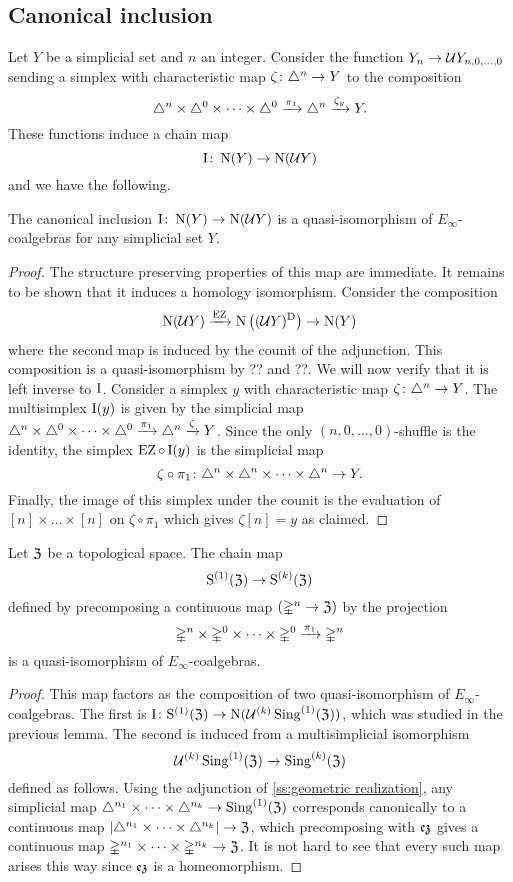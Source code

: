\subsection{Canonical inclusion}

Let $Y$ be a simplicial set and $n$ an integer.
Consider the function $Y_n \to \mathcal{U} Y_{n,0,\dots,0}$ sending a simplex with characteristic map $\zeta \colon \triangle^n \to Y$ to the composition
\[
\triangle^n \times \triangle^{0}\times\dots\times\triangle^{0} \xrightarrow{\pi_1} \triangle^n \xrightarrow{\zeta_y} Y.
\]
These functions induce a chain map
\[
\operatorname{I} \colon \operatorname{N}(Y) \to \operatorname{N}(\mathcal{U} Y)
\]
and we have the following.

\begin{lemma*}
	The canonical inclusion $\operatorname{I} \colon \operatorname{N}(Y) \to \operatorname{N}(\mathcal{U} Y)$ is a quasi-isomorphism of $E_\infty$-coalgebras for any simplicial set $Y$.
\end{lemma*}

\begin{proof}
	The structure preserving properties of this map are immediate.
	It remains to be shown that it induces a homology isomorphism.
	Consider the composition
	\[
	\operatorname{N}(\mathcal{U} Y) \xrightarrow{\operatorname{EZ}}
	\operatorname{N}\big((\mathcal{U} Y)^{\mathrm{D}}\big) \to
	\operatorname{N}(Y)
	\]
	where the second map is induced by the counit of the adjunction.
	This composition is a quasi-isomorphism by ?? and ??.
	We will now verify that it is left inverse to $\operatorname{I}$.
	Consider a simplex $y$ with characteristic map $\zeta \colon \triangle^n \to Y$.
	The multisimplex $\operatorname{I}(y)$ is given by the simplicial map $\triangle^n \times \triangle^{0}\times\dots\times\triangle^{0} \xrightarrow{\pi_1} \triangle^n \xrightarrow{\zeta} Y$.
	Since the only $(n,0,\dots,0)$-shuffle is the identity, the simplex $\operatorname{EZ} \circ \operatorname{I} (y)$ is the simplicial map
	\[
	\zeta \circ \pi_1 \colon \triangle^n \times \triangle^{n}\times\dots\times\triangle^{n} \to Y.
	\]
	Finally, the image of this simplex under the counit is the evaluation of $[n] \times\dots\times [n]$ on $\zeta \circ \pi_1$ which gives $\zeta[n] = y$ as claimed.
\end{proof}

\begin{corollary*}
	Let $\mathfrak{Z}$ be a topological space.
	The chain map
	\[
	\mathrm{S}^{(1)}(\mathfrak{Z}) \to \mathrm{S}^{(k)}(\mathfrak{Z})
	\]
	defined by precomposing a continuous map $(\mathbb{\Delta}^n \to \mathfrak{Z})$ by the projection
	\[
	\mathbb{\Delta}^n \times \mathbb{\Delta}^{0}\times\dots\times\mathbb{\Delta}^{0} \xrightarrow{\pi_1} \mathbb{\Delta}^n
	\]
	is a quasi-isomorphism of $E_\infty$-coalgebras.
\end{corollary*}

\begin{proof}
	This map factors as the composition of two quasi-isomorphism of $E_\infty$-coalgebras.
	The first is $\operatorname{I} \colon \mathrm{S}^{(1)}(\mathfrak{Z}) \to \operatorname{N}(\mathcal{U}^{(k)} \operatorname{Sing}^{(1)}(\mathfrak{Z}))$, which was studied in the previous lemma.
	The second is induced from a multisimplicial isomorphism
	\[
	\mathcal{U}^{(k)} \operatorname{Sing}^{(1)}(\mathfrak{Z}) \to \operatorname{Sing}^{(k)}(\mathfrak{Z})
	\]
	defined as follows.
	Using the adjunction of \cref{ss:geometric realization}, any simplicial map $\triangle^{n_1}\times\dots\times\triangle^{n_k} \to \operatorname{Sing}^{(1)}(\mathfrak{Z})$ corresponds canonically to a continuous map $\lvert\triangle^{n_1}\times\dots\times\triangle^{n_k}\rvert \to \mathfrak{Z}$, which precomposing with $\operatorname{\mathfrak{ez}}$ gives a continuous map $\mathbb{\Delta}^{n_1}\times\dots\times\mathbb{\Delta}^{n_k} \to \mathfrak{Z}$.
	It is not hard to see that every such map arises this way since $\operatorname{\mathfrak{ez}}$ is a homeomorphism.
\end{proof}
